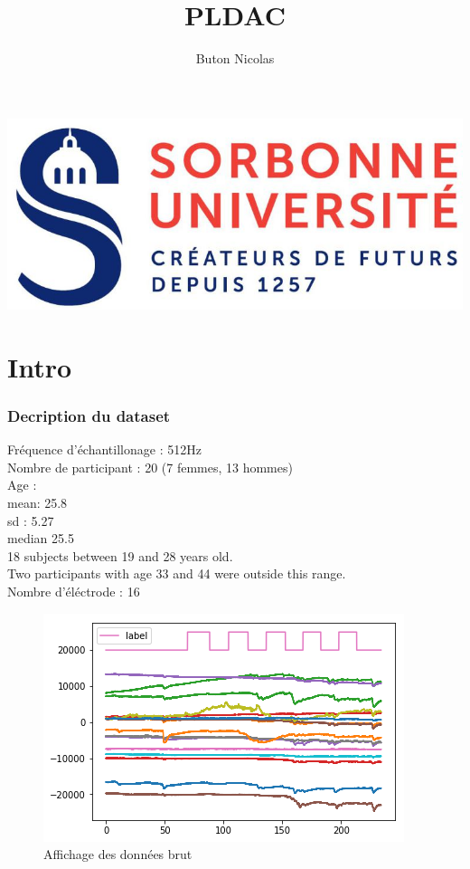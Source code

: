 \documentclass{article}
\title{PLDAC}
\author{Buton Nicolas}
\begin{document}
\maketitle
\includegraphics[scale=1]{images/logoSorbonne.jpg}
\newpage
\tableofcontents
\newpage
{}
\part{Intro}
\section{Decription du dataset}
Fréquence d'échantillonage : 512Hz\\
Nombre de participant : 20 (7 femmes, 13 hommes)\\
Age : \\
mean: 25.8 \\
sd : 5.27 \\
median 25.5\\
18 subjects between 19 and 28 years old.\\
Two participants with age 33 and 44 were outside this range.\\
Nombre d'éléctrode : 16\\
\begin{figure}[H]
\begin{center}
\includegraphics[scale=0.8]{images/donnees_entree.png}
\end{center}
\caption{Affichage des données brut}
\end{figure}
\end{document}
